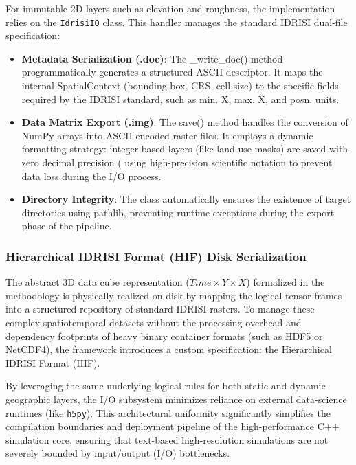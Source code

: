 For immutable 2D layers such as elevation and roughness, the implementation relies on the \texttt{IdrisiIO} class. This 
handler manages the standard IDRISI dual-file specification:

\begin{itemize}
    \item \textbf{Metadata Serialization (.doc)}: The \_write\_doc() method programmatically generates a structured 
    ASCII descriptor. It maps the internal SpatialContext (bounding box, CRS, cell size) to the specific fields 
    required by the IDRISI standard, such as min. X, max. X, and posn. units.
    \item \textbf{Data Matrix Export (.img)}: The save() method handles the conversion of NumPy arrays into 
    ASCII-encoded raster files. It employs a dynamic formatting strategy: integer-based layers (like land-use masks) 
    are saved with zero decimal precision (%
    using high-precision scientific notation to prevent data loss during the I/O process.
    \item \textbf{Directory Integrity}: The class automatically ensures the existence of target directories using 
    pathlib, preventing runtime exceptions during the export phase of the pipeline.
\end{itemize}


\subsubsection{Hierarchical IDRISI Format (HIF) Disk Serialization}
\label{subsubsec:hif_implementation}

The abstract 3D data cube representation ($Time \times Y \times X$) formalized in the methodology is physically realized on disk by mapping 
the logical tensor frames into a structured repository of standard IDRISI rasters. To manage these complex spatiotemporal datasets without 
the processing overhead and dependency footprints of heavy binary container formats (such as HDF5 or NetCDF4), the framework introduces a 
custom specification: the Hierarchical IDRISI Format (HIF). 

By leveraging the same underlying logical rules for both static and dynamic geographic layers, the I/O subsystem minimizes reliance on 
external data-science runtimes (like \texttt{h5py}). This architectural uniformity significantly simplifies the compilation boundaries and 
deployment pipeline of the high-performance C++ simulation core, ensuring that text-based high-resolution simulations are not severely 
bounded by input/output (I/O) bottlenecks.

